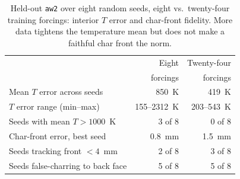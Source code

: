 \documentclass[conference]{IEEEtran}
\begin{document}
\begin{table}[t]
\caption{Held-out \texttt{aw2} over eight random seeds, eight vs.\ twenty-four
training forcings: interior $T$ error and char-front fidelity. More data tightens
the temperature mean but does not make a faithful char front the norm.}
\label{tab:seeds}
\centering
\begin{tabular}{lrr}
\toprule
 & Eight & Twenty-four \\
 & forcings & forcings \\
\midrule
Mean $T$ error across seeds       & 850~K       & 419~K \\
$T$ error range (min--max)        & 155--2312~K & 203--543~K \\
Seeds with mean $T > 1000$~K      & 3 of 8      & 0 of 8 \\
Char-front error, best seed       & 0.8~mm      & 1.5~mm \\
Seeds tracking front $<4$~mm      & 2 of 8      & 3 of 8 \\
Seeds false-charring to back face & 5 of 8      & 5 of 8 \\
\bottomrule
\end{tabular}
\end{table}
\end{document}
